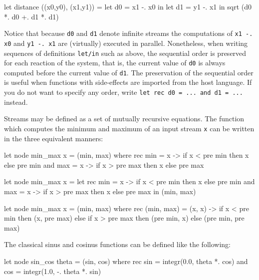 \documentclass[11pt,titlepage,twoside]{report}
\begin{document}
\begin{runverbatim}
let distance ((x0,y0), (x1,y1)) =
  let d0 = x1 -. x0 in
  let d1 = y1 -. x1 in
  sqrt (d0 *. d0 +. d1 *. d1)
\end{runverbatim}
Notice that because \verb-d0- and \verb-d1- denote infinite streams
the computations of \verb+x1 -. x0+ and \verb+y1 -. x1+ are
(virtually) executed in parallel.  Nonetheless, when writing sequences
of definitions \verb-let/in- such as above, the sequential order is
preserved for each reaction of the system, that is, the current value
of \verb-d0- is always computed before the current value of
\verb-d1-. The preservation of the sequential order is useful when functions
with side-effects are imported from the host language. If you do not want to
specify any order, write \texttt{let rec d0 = ... and d1 = ...} instead.

Streams may be defined as a set of mutually recursive equations.  The
function which computes the minimum and maximum of an input stream
\verb-x- can be written in the three equivalent manners:
\begin{runverbatim}
let node min_max x = (min, max) where
  rec min = x -> if x < pre min then x else pre min
  and max = x -> if x > pre max then x else pre max
\end{runverbatim}

\begin{runverbatim}
let node min_max x =
  let rec min = x -> if x < pre min then x else pre min
  and max = x -> if x > pre max then x else pre max in
  (min, max)
\end{runverbatim}

\begin{runverbatim}
let node min_max x = (min, max) where
  rec (min, max) = (x, x) -> if x < pre min then (x, pre max)
                             else if x > pre max then (pre min, x)
                             else (pre min, pre max)
\end{runverbatim}

\noindent The classical sinus and cosinus functions can be defined like the
following:
\begin{runverbatim}[continue,include=integr]
let node sin_cos theta = (sin, cos) where
  rec sin = integr(0.0, theta *. cos)
  and cos = integr(1.0, -. theta *. sin)
\end{runverbatim}

\end{document}
